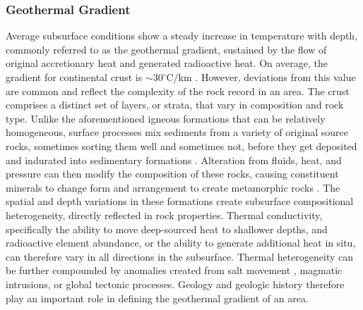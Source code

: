 \subsubsection{Geothermal Gradient}\label{ch2:geotherm}
Average subsurface conditions show a steady increase in temperature with depth, commonly referred to as the geothermal gradient, sustained by the flow of original accretionary heat and generated radioactive heat. On average, the gradient for continental crust is $\sim30^\circ$C/km \citep[~p. 209]{press_understanding_2004}. However, deviations from this value are common and reflect the complexity of the rock record in an area. The crust comprises a distinct set of layers, or strata, that vary in composition and rock type. Unlike the aforementioned igneous formations that can be relatively homogeneous, surface processes mix sediments from a variety of original source rocks, sometimes sorting them well and sometimes not, before they get deposited and indurated into sedimentary formations \citep[~p. 164-168]{press_understanding_2004}. Alteration from fluids, heat, and pressure can then modify the composition of these rocks, causing constituent minerals to change form and arrangement to create metamorphic rocks \citep[~p. 195-205]{press_understanding_2004}. The spatial and depth variations in these formations create subsurface compositional heterogeneity, directly reflected in rock properties. Thermal conductivity, specifically the ability to move deep-sourced heat to shallower depths, and radioactive element abundance, or the ability to generate additional heat in situ, can therefore vary in all directions in the subsurface. Thermal heterogeneity can be further compounded by anomalies created from salt movement \citep[~p. 164-168]{press_understanding_2004}, magmatic intrusions, or global tectonic processes. Geology and geologic history therefore play an important role in defining the geothermal gradient of an area.

